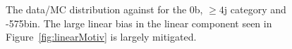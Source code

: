 \begin{figure}[h!]
  \centering
  ~~
  \\
  ~~
  \\
  \caption{\label{fig:linearFits0bGe4} 
  The data/MC distribution against \mht for the 0b, $\ge4$j category and -575\GeV bin.
  The large linear bias in the linear component seen in Figure~\ref{fig:linearMotiv} is
  largely mitigated.
}
\end{figure}


